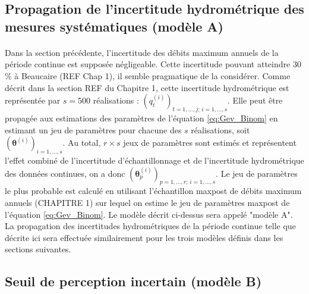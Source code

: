 	

	
	\subsection{Propagation de l'incertitude hydrométrique des mesures systématiques (modèle A)}
	\label{subsec:modA}
	
	\paragraph{}
	Dans la section précédente, l'incertitude des débits maximum annuels de la période continue est supposée négligeable. Cette incertitude pouvant atteindre 30 \% à Beaucaire (REF Chap 1), il semble pragmatique de la considérer. Comme décrit dans la section REF du Chapitre 1, cette incertitude hydrométrique est représentée par $s = 500$ réalisations : $(q_t^{(i)})_{t=1,...,j;\,i=1,...,s}$. Elle peut être propagée aux estimations des paramètres de l'équation \ref{eq:Gev_Binom} en estimant un jeu de paramètres pour chacune des $s$ réalisations, soit $(\boldsymbol{\theta}
	^{(i)})_{i=1,...,s}$. Au total, $r \times s$ jeux de paramètres sont estimés et représentent l'effet combiné de l'incertitude d'échantillonnage et de l'incertitude hydrométrique des données continues, on a donc $(\boldsymbol{\theta}^{(i)}_p)_{p=1,...,r;\, i=1,...,s}$. Le jeu de paramètres le plus probable est calculé en utilisant l'échantillon maxpost de débits maximum annuels (CHAPITRE 1) sur lequel on estime le jeu de paramètres maxpost de l'équation \ref{eq:Gev_Binom}. Le modèle décrit ci-dessus sera appelé "modèle A". La propagation des incertitudes hydrométriques de la période continue telle que décrite ici sera effectuée similairement pour les trois modèles définis dans les sections suivantes.
	
	\subsection{Seuil de perception incertain (modèle B)}
	\label{subsec:modB}
	
